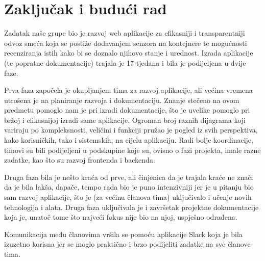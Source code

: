 \chapter{Zaključak i budući rad}
		
		
		

		Zadatak naše grupe bio je razvoj web aplikacije za efikasniji i transparentniji odvoz smeća koja se postiže dodavanjem senzora na kontejnere te mogućnosti recenziranja istih kako bi se doznalo njihovo stanje i urednost. Izrada aplikacije (te popratne dokumentacije) trajala je 17 tjedana i bila je podijeljena u dvije faze.
		
		Prva faza započela je okupljanjem tima za razvoj aplikacije, ali većina vremena utrošena je na planiranje razvoja i dokumentaciju. Znanje stečeno na ovom predmetu pomoglo nam je pri izradi dokumentacije, što je uvelike pomoglo pri bržoj i efikasnijoj izradi same aplikacije. Ogroman broj raznih dijagrama koji variraju po kompleksnosti, veličini i funkciji pružao je pogled iz svih perspektiva, kako korisničkih, tako i sistemskih, na cijelu aplikaciju. Radi bolje koordinacije, timovi su bili podijeljeni u podskupine koje su, ovisno o fazi projekta, imale razne zadatke, kao što su razvoj frontenda i backenda. 
		
		Druga faza bila je nešto kraća od prve, ali činjenica da je trajala kraće ne znači da je bila lakša, dapače, tempo rada bio je puno intenzivniji jer je u pitanju bio sam razvoj aplikacije, što je (za većinu članova tima) uključivalo i učenje novih tehnologija i alata. Druga faza uključivala je i završetak projektne dokumentacije koja je, unatoč tome što najveći fokus nije bio na njoj, uspješno odrađena.
		
		Komunikacija među članovima vršila se pomoću aplikacije Slack koja je bila izuzetno korisna jer se moglo praktično i brzo podijeliti zadatke na sve članove tima.
		
